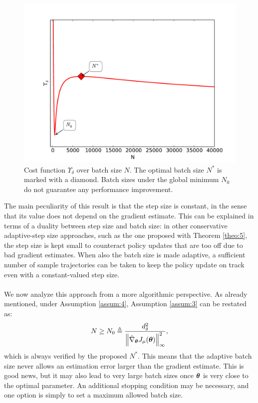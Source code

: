 \begin{figure}[H]
\includegraphics[width = \textwidth,center]{Images/upsilon.pdf}
\caption[Cost function $\Upsilon_\delta$ over batch size $N$.]{Cost function $\Upsilon_\delta$ over batch size $N$. The optimal batch size $N^*$ is marked with a diamond. Batch sizes under the global minimum $N_0$ do not guarantee any performance improvement.}
\label{fig:0}
\end{figure}

The main peculiarity of this result is that the step size is constant, in the sense that its value does not depend on the gradient estimate. This can be explained in terms of a duality between step size and batch size: in other conservative adaptive-step size approaches, such as the one proposed with Theorem \ref{theo:5}, the step size is kept small to counteract policy updates that are too off due to bad gradient estimates. When also the batch size is made adaptive, a sufficient number of sample trajectories can be taken to keep the policy update on track even with a constant-valued step size.
\paragraph{}
We now analyze this approach from a more algorithmic perspective.
As already mentioned, under Assumption \ref{assum:4}, Assumption \ref{assum:3} can be restated as:
\[
	N \geq N_0 \triangleq \frac{d_\delta^2}{\norm[\infty]{\gradApp{\vtheta}}^2},
\]
which is always verified by the proposed $N^*$. This means that the adaptive batch size never allows an estimation error larger than the gradient estimate. This is good news, but it may also lead to very large batch sizes once $\vtheta$ is very close to the optimal parameter. An additional stopping condition may be necessary, and one option is simply to set a maximum allowed batch size.
